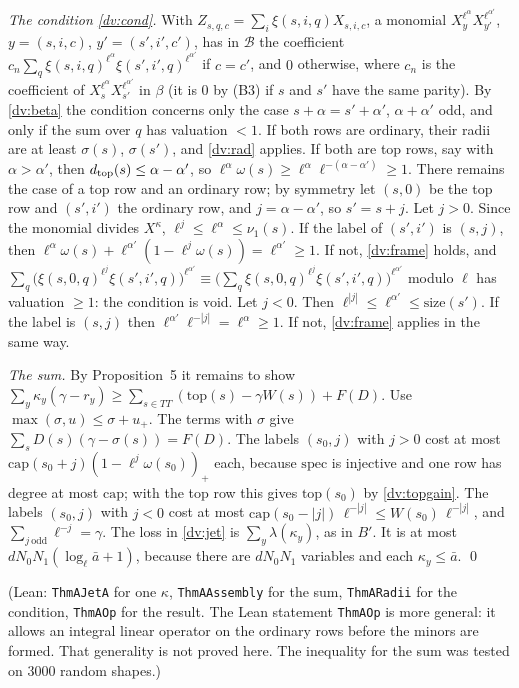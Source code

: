 \documentclass[11pt,letterpaper]{article}
\begin{document}
\emph{The condition \eqref{dv:cond}.} With $Z_{s,q,c}=\sum_i\xi(s,i,q)X_{s,i,c}$, a monomial
$X_y^{\ell^\alpha}X_{y'}^{\ell^{\alpha'}}$, $y=(s,i,c)$, $y'=(s',i',c')$, has in $\mathcal B$ the coefficient
$c_n\sum_q\xi(s,i,q)^{\ell^\alpha}\xi(s',i',q)^{\ell^{\alpha'}}$ if $c=c'$, and $0$ otherwise, where $c_n$ is the
coefficient of $X_s^{\ell^\alpha}X_{s'}^{\ell^{\alpha'}}$ in $\beta$ (it is $0$ by (B3) if $s$ and $s'$ have the
same parity). By \eqref{dv:beta} the condition concerns
only the case $s+\alpha=s'+\alpha'$, $\alpha+\alpha'$ odd, and only if the sum over $q$ has valuation $<1$.
If both rows are ordinary, their radii are at least $\sigma(s)$, $\sigma(s')$, and \eqref{dv:rad} applies.
If both are top rows, say with $\alpha>\alpha'$, then $d_{\rm top}(s)\le\alpha-\alpha'$, so
$\ell^\alpha\omega(s)\ge\ell^\alpha\ell^{-(\alpha-\alpha')}\ge1$. There remains the case of a top row and an ordinary row; by symmetry let $(s,0)$ be the top row and
$(s',i')$ the ordinary row, and $j=\alpha-\alpha'$, so $s'=s+j$. Let $j>0$. Since the monomial divides $X^\kappa$,
$\ell^j\le\ell^\alpha\le\nu_1(s)$. If the label of $(s',i')$ is $(s,j)$, then
$\ell^\alpha\omega(s)+\ell^{\alpha'}(1-\ell^j\omega(s))=\ell^{\alpha'}\ge1$. If not, \eqref{dv:frame}
holds, and $\sum_q\big(\xi(s,0,q)^{\ell^j}\xi(s',i',q)\big)^{\ell^{\alpha'}}\equiv
\big(\sum_q\xi(s,0,q)^{\ell^j}\xi(s',i',q)\big)^{\ell^{\alpha'}}$ modulo $\ell$ has valuation $\ge1$: the condition
is void. Let $j<0$. Then $\ell^{|j|}\le\ell^{\alpha'}\le\mathrm{size}(s')$. If the label is $(s,j)$ then
$\ell^{\alpha'}\ell^{-|j|}=\ell^\alpha\ge1$. If not, \eqref{dv:frame} applies in the same way.

\emph{The sum.} By Proposition~5 it remains to show $\sum_y\kappa_y(\gamma-r_y)\ge
\sum_{s\in\mathit{TT}}(\mathrm{top}(s)-\gamma W(s))+F(D)$. Use $\max(\sigma,u)\le\sigma+u_+$. The terms with
$\sigma$ give $\sum_sD(s)(\gamma-\sigma(s))=F(D)$. The labels $(s_0,j)$ with $j>0$ cost at most
$\mathrm{cap}(s_0+j)(1-\ell^j\omega(s_0))_+$ each, because $\mathrm{spec}$ is injective and one row has
degree at most $\mathrm{cap}$; with the top row this gives $\mathrm{top}(s_0)$ by \eqref{dv:topgain}. The
labels $(s_0,j)$ with $j<0$ cost at most $\mathrm{cap}(s_0-|j|)\,\ell^{-|j|}\le W(s_0)\,\ell^{-|j|}$, and
$\sum_{j\ \mathrm{odd}}\ell^{-j}=\gamma$. The loss in \eqref{dv:jet} is $\sum_y\lambda(\kappa_y)$, as in $B'$. It is at most
$dN_0N_1(\log_\ell\bar a+1)$, because there are $dN_0N_1$ variables and each $\kappa_y\le\bar a$. \qed

\noindent (Lean: \texttt{ThmAJetA} for one $\kappa$, \texttt{ThmAAssembly} for the sum, \texttt{ThmARadii}
for the condition, \texttt{ThmAOp} for the result. The Lean statement \texttt{ThmAOp} is more general: it
allows an integral linear operator on the ordinary rows before the minors are formed. That generality is
not proved here. The inequality for the sum was tested on $3000$ random shapes.)
\end{document}
